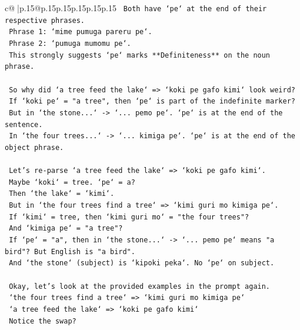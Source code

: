 \documentclass{article}
\begin{document}
{\begin{supertabular}{c@{$\;$}|p{.15\linewidth}@{}p{.15\linewidth}p{.15\linewidth}p{.15\linewidth}p{.15\linewidth}p{.15\linewidth}}
{{{\texttt{                    Both have `pe` at the end of their respective phrases.} \\
\texttt{                    Phrase 1: `mime pumuga pareru pe`.} \\
\texttt{                    Phrase 2: `pumuga mumomu pe`.} \\
\texttt{                    This strongly suggests `pe` marks **Definiteness** on the noun phrase.} \\
\\ 
\texttt{                    So why did `a tree feed the lake` => `koki pe gafo kimi` look weird?} \\
\texttt{                    If `koki pe` = "a tree", then `pe` is part of the indefinite marker?} \\
\texttt{                    But in `the stone...` {-}> `... pemo pe`. `pe` is at the end of the sentence.} \\
\texttt{                    In `the four trees...` {-}> `... kimiga pe`. `pe` is at the end of the object phrase.} \\
\\ 
\texttt{                    Let's re{-}parse `a tree feed the lake` => `koki pe gafo kimi`.} \\
\texttt{                    Maybe `koki` = tree. `pe` = a?} \\
\texttt{                    Then `the lake` = `kimi`.} \\
\texttt{                    But in `the four trees find a tree` => `kimi guri mo kimiga pe`.} \\
\texttt{                    If `kimi` = tree, then `kimi guri mo` = "the four trees"?} \\
\texttt{                    And `kimiga pe` = "a tree"?} \\
\texttt{                    If `pe` = "a", then in `the stone...` {-}> `... pemo pe` means "a bird"? But English is "a bird".} \\
\texttt{                    And `the stone` (subject) is `kipoki peka`. No `pe` on subject.} \\
\\ 
\texttt{                    Okay, let's look at the provided examples in the prompt again.} \\
\texttt{                    `the four trees find a tree` => `kimi guri mo kimiga pe`} \\
\texttt{                    `a tree feed the lake` => `koki pe gafo kimi`} \\
\texttt{                    Notice the swap?} \\
}}}
\end{supertabular}}
\end{document}
